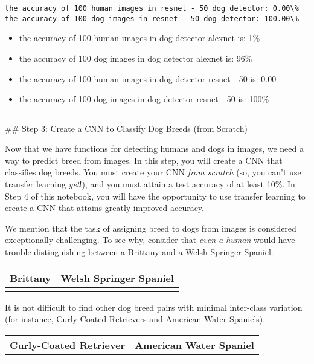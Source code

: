 \documentclass[11pt]{article}
\begin{document}
    \begin{Verbatim}[commandchars=\\\{\}]
the accuracy of 100 human images in resnet - 50 dog detector: 0.00\%
the accuracy of 100 dog images in resnet - 50 dog detector: 100.00\%

    \end{Verbatim}

    \begin{itemize}
\item
  the accuracy of 100 human images in dog detector alexnet is: 1\%
\item
  the accuracy of 100 dog images in dog detector alexnet is: 96\%
\item
  the accuracy of 100 human images in dog detector resnet - 50 is: 0.00
\item
  the accuracy of 100 dog images in dog detector resnet - 50 is: 100\%
\end{itemize}

    \begin{center}\rule{0.5\linewidth}{\linethickness}\end{center}

 \#\# Step 3: Create a CNN to Classify Dog Breeds (from Scratch)

Now that we have functions for detecting humans and dogs in images, we
need a way to predict breed from images. In this step, you will create a
CNN that classifies dog breeds. You must create your CNN \emph{from
scratch} (so, you can't use transfer learning \emph{yet}!), and you must
attain a test accuracy of at least 10\%. In Step 4 of this notebook, you
will have the opportunity to use transfer learning to create a CNN that
attains greatly improved accuracy.

We mention that the task of assigning breed to dogs from images is
considered exceptionally challenging. To see why, consider that
\emph{even a human} would have trouble distinguishing between a Brittany
and a Welsh Springer Spaniel.

\begin{longtable}[]{@{}ll@{}}
\toprule
Brittany & Welsh Springer Spaniel\tabularnewline
\midrule
\endhead
&\tabularnewline
\bottomrule
\end{longtable}

It is not difficult to find other dog breed pairs with minimal
inter-class variation (for instance, Curly-Coated Retrievers and
American Water Spaniels).

\begin{longtable}[]{@{}ll@{}}
\toprule
Curly-Coated Retriever & American Water Spaniel\tabularnewline
\midrule
\endhead
&\tabularnewline
\bottomrule
\end{longtable}
\end{document}
